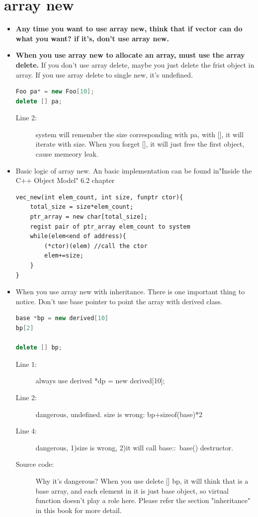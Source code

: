 \documentclass[a4paper,11pt,twoside]{book}
\begin{document}
\section{array new}
\begin{itemize}
	\item \textbf{Any time you want to use array new, think that if vector can do what you want? if it's, don't use array new.}
	
	\item \textbf{When you use array new to allocate an array, must use the array delete.} If you don't use array delete, maybe you just delete the frist object in array. If you use array delete to single new, it's undefined. 
\begin{lstlisting}[frame=single, language=c++]
Foo pa* = new Foo[10];
delete [] pa;
\end{lstlisting}

\begin{description}
	\item[Line 2:] system will remember the size corresponding with pa,  with [], it will iterate with size.  When you forget [], it will just free the first object, cause memeory leak.
\end{description}

	\item Basic logic of array new. An basic implementation can be found in"Inside the C++ Object Model" 6.2 chapter
\begin{lstlisting}[numbers=none]
vec_new(int elem_count, int size, funptr ctor){
	total_size = size*elem_count;
	ptr_array = new char[total_size];
	regist pair of ptr_array elem_count to system
	while(elem<end of address){
		(*ctor)(elem) //call the ctor
		elem+=size;
	}
}
\end{lstlisting}
	
	\item When you use array new with inheritance. There is one important thing to notice. Don't use base pointer to point the array with derived class. 
\begin{lstlisting}[frame=single, language=c++]
base *bp = new derived[10]
bp[2] 
	
delete [] bp;
\end{lstlisting}
\begin{description}
	\item[Line 1:] always use derived *dp = new derived[10];
	\item[Line 2:] dangerous, undefined. size is wrong: bp+sizeof(base)*2
	\item[Line 4:] dangerous, 1)size is wrong, 2)it will call base::~base() destructor. 
	
	\item[Source code:] Why it's dangerous? When you use delete [] bp, it will think that is a base array, and each element in it is just base object, so virtual function doesn't play a role here. Please refer the section "inheritance" in this book for more detail.
\end{description}

\end{itemize}
\end{document}
